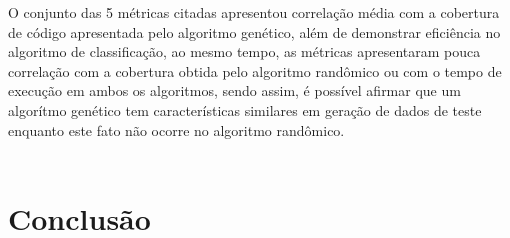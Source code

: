 \documentclass[
	12pt,				%
	oneside,			%
	a4paper,			%
	english,			%
	brazil				%
	]{abntex2ppgsi}
\begin{document}
O conjunto das 5 métricas citadas apresentou correlação média com a cobertura de código apresentada pelo algoritmo genético, além de demonstrar eficiência no algoritmo de classificação, ao mesmo tempo,  as métricas apresentaram pouca correlação com a cobertura obtida pelo algoritmo randômico ou com o tempo de execução em ambos os algoritmos, sendo assim, é possível afirmar que um algorítmo genético tem características similares em geração de dados de teste enquanto este fato não ocorre no algoritmo randômico. \\


\\



\chapter{Conclusão}
\label{chap:conclusao}


\postextual



%
%


\begin{apendicesenv}


%
%
%




\end{apendicesenv}
\end{document}
